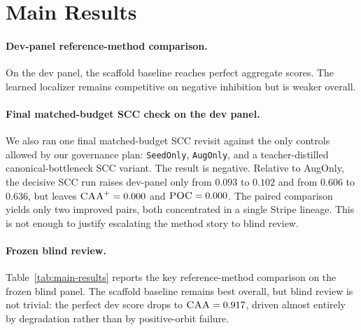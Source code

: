 \section{Main Results}
\label{sec:results}

\paragraph{Dev-panel reference-method comparison.}
On the dev panel, the scaffold baseline reaches perfect aggregate scores. The learned localizer remains competitive on negative inhibition but is weaker overall.

\paragraph{Final matched-budget SCC check on the dev panel.}
We also ran one final matched-budget SCC revisit against the only controls allowed by our governance plan: \texttt{SeedOnly}, \texttt{AugOnly}, and a teacher-distilled canonical-bottleneck SCC variant. The result is negative. Relative to AugOnly, the decisive SCC run raises dev-panel \CAA{} only from $0.093$ to $0.102$ and \NOS{} from $0.606$ to $0.636$, but leaves $\textsc{CAA}^{+}=0.000$ and $\textsc{POC}=0.000$. The paired comparison yields only two improved pairs, both concentrated in a single Stripe lineage. This is not enough to justify escalating the method story to blind review.

\paragraph{Frozen blind review.}
Table~\ref{tab:main-results} reports the key reference-method comparison on the frozen blind panel. The scaffold baseline remains best overall, but blind review is not trivial: the perfect dev score drops to $\textsc{CAA}=0.917$, driven almost entirely by \NOS{} degradation rather than by positive-orbit failure.

\begin{table}[t]
\centering
\small
\setlength{\tabcolsep}{4pt}
\caption{Reference methods on the dev panel and the frozen blind panel. The scaffold baseline remains best overall after blind review; its degradation is concentrated in \NOS{}, while $\CAA^{+}$ and \POC{} remain intact.}
\label{tab:main-results}
\end{table}

